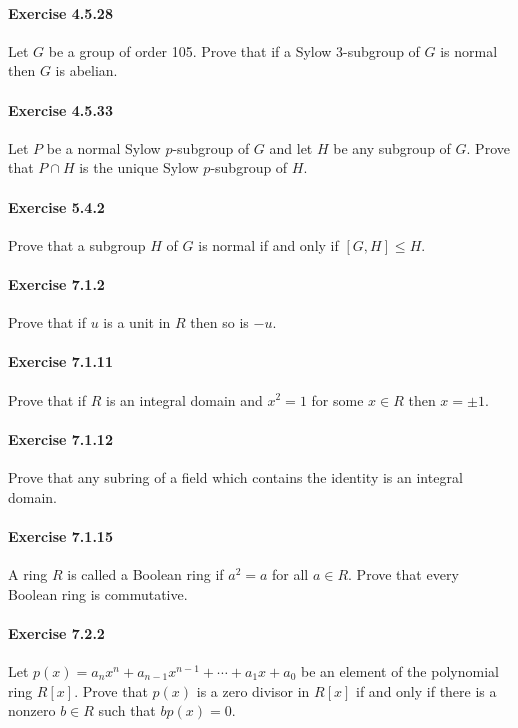\documentclass{article}
\begin{document}
\paragraph{Exercise 4.5.28} Let $G$ be a group of order 105. Prove that if a Sylow 3-subgroup of $G$ is normal then $G$ is abelian.

\paragraph{Exercise 4.5.33} Let $P$ be a normal Sylow $p$-subgroup of $G$ and let $H$ be any subgroup of $G$. Prove that $P \cap H$ is the unique Sylow $p$-subgroup of $H$.

\paragraph{Exercise 5.4.2} Prove that a subgroup $H$ of $G$ is normal if and only if $[G, H] \leq H$.

\paragraph{Exercise 7.1.2} Prove that if $u$ is a unit in $R$ then so is $-u$.

\paragraph{Exercise 7.1.11} Prove that if $R$ is an integral domain and $x^{2}=1$ for some $x \in R$ then $x=\pm 1$.

\paragraph{Exercise 7.1.12} Prove that any subring of a field which contains the identity is an integral domain.

\paragraph{Exercise 7.1.15} A ring $R$ is called a Boolean ring if $a^{2}=a$ for all $a \in R$. Prove that every Boolean ring is commutative.

\paragraph{Exercise 7.2.2} Let $p(x)=a_{n} x^{n}+a_{n-1} x^{n-1}+\cdots+a_{1} x+a_{0}$ be an element of the polynomial ring $R[x]$. Prove that $p(x)$ is a zero divisor in $R[x]$ if and only if there is a nonzero $b \in R$ such that $b p(x)=0$.
\end{document}

